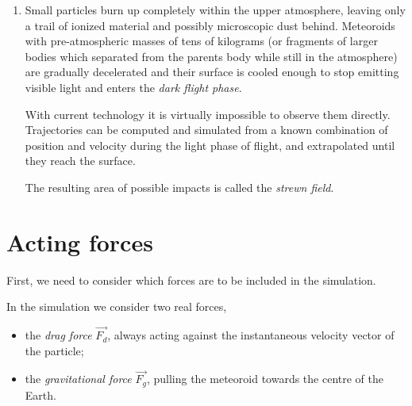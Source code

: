 \begin{enumerate}
                The density of the atmosphere at this altitude presents significant drag.


                dynamical pressure may exceed the toughness of the particle,
                so fragmentation is also possible. Peak brightness

                For more massive meteoroids (masses on the order of kilograms to tons) the light phase often continues
                to below \SI{50}{\kilo\metre} or even lower. Very dense and solid meteoroids or small asteroids
                it is possible not to be slowed down and impact the surface at hypersonic speeds,
                emitting light until the last moment.

            \item
                Small particles burn up completely within the upper atmosphere,
                leaving only a trail of ionized material and possibly microscopic dust behind.
                Meteoroids with pre-atmospheric masses of tens of kilograms (or fragments
                of larger bodies which separated from the parents body while still in the atmosphere)
                are gradually decelerated and their surface is cooled enough
                to stop emitting visible light and enters the \emph{dark flight phase}.

                With current technology it is virtually impossible to observe them directly.
                Trajectories can be computed and simulated from a known combination
                of position and velocity during the light phase of flight, and extrapolated
                until they reach the surface.

                The resulting area of possible impacts is called the \emph{strewn field}.
        \end{enumerate}


\section{Acting forces} \label{df}
    First, we need to consider which forces are to be included in the simulation.

    In the simulation we consider two real forces,
    \begin{itemize}
        \item the \emph{drag force} $\vec{F_d}$, always acting against the instantaneous velocity vector of the particle;
        \item the \emph{gravitational force} $\vec{F_g}$, pulling the meteoroid towards the centre of the Earth.
    \end{itemize}

